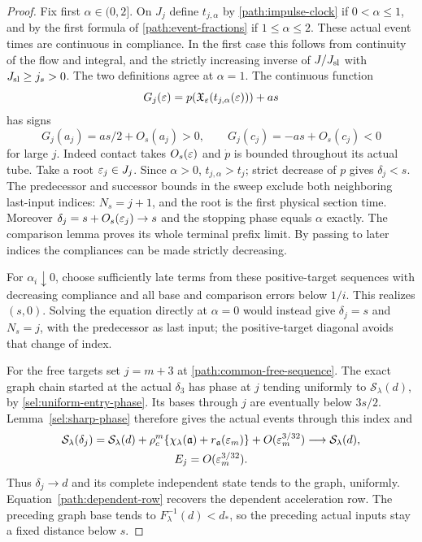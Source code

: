 \begin{proof}
Fix first $\alpha\in(0,2]$.  On $J_j$ define $t_{j,\alpha}$
by \eqref{path:impulse-clock} if $0<\alpha\le1$, and by the
first formula of \eqref{path:event-fractions} if $1\le\alpha\le2$.
These actual event times are continuous in compliance.  In the
first case this follows from continuity of the flow and integral,
and the strictly increasing inverse of $J/J_{\rm sl}$ with $J_{\rm sl}\ge j_s>0$.
The two definitions agree at $\alpha=1$.  The continuous function
\[
 G_j(\varepsilon)=p(\mathfrak X_\varepsilon(t_{j,\alpha}(\varepsilon)))+as
\]
has signs
\begin{equation}
 G_j(a_j)=as/2+O_s(a_j)>0,\qquad
 G_j(c_j)=-as+O_s(c_j)<0
 \label{path:phase-scan-signs}
\end{equation}
for large $j$.  Indeed contact takes $O_s(\varepsilon)$ and $\dot p$ is
bounded throughout its actual tube.  Take a root $\varepsilon_j\in J_j$.
Since $\alpha>0$, $t_{j,\alpha}>t_j$; strict decrease of $p$ gives
$\delta_j<s$.  The predecessor and successor bounds in the sweep
exclude both neighboring last-input indices: $N_s=j+1$, and the
root is the first physical section time.  Moreover
$\delta_j=s+O_s(\varepsilon_j)\to s$ and the stopping phase equals
$\alpha$ exactly.  The comparison lemma proves its whole terminal
prefix limit.  By passing to later indices the compliances can be
made strictly decreasing.

For $\alpha_i\downarrow0$, choose sufficiently late terms from
these positive-target sequences with decreasing compliance and
all base and comparison errors below $1/i$.  This realizes $(s,0)$.
Solving the equation directly at $\alpha=0$ would instead give
$\delta_j=s$ and $N_s=j$, with the predecessor as last input;
the positive-target diagonal avoids that change of index.

For the free targets set $j=m+3$ at
\eqref{path:common-free-sequence}. The exact graph chain started at
the actual $\delta_3$ has phase at $j$ tending uniformly to
$\mathcal S_\lambda(d)$, by \eqref{sel:uniform-entry-phase}.
Its bases through $j$ are eventually below $3s/2$.
Lemma~\ref{sel:sharp-phase} therefore gives the actual events through
this index and
\begin{equation}
 \begin{gathered}
 \mathcal S_\lambda(\delta_j)
 =\mathcal S_\lambda(d)+\rho_c^m
       \{\chi_\lambda(\mathfrak a)+r_{\mathfrak a}(\varepsilon_m)\}
             +O(\varepsilon_m^{3/32})\longrightarrow\mathcal S_\lambda(d),\\
 E_j=O(\varepsilon_m^{3/32}).
 \end{gathered}
 \label{path:common-free-budget}
\end{equation}
Thus $\delta_j\to d$ and its complete independent state tends to
the graph, uniformly. Equation~\eqref{path:dependent-row} recovers
the dependent acceleration row. The preceding graph base tends to
$F_\lambda^{-1}(d)<d_*$, so the preceding actual inputs stay a
fixed distance below $s$.


\end{proof}
